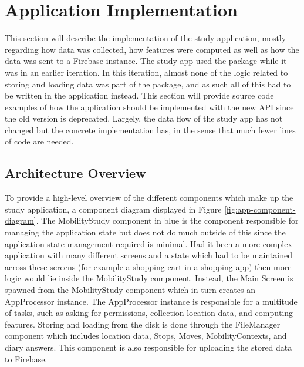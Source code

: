 \section{Application Implementation}
This section will describe the implementation of the study application, mostly regarding how data was collected, how features were computed as well as how the data was sent to a Firebase instance. The study app used the package while it was in an earlier iteration. In this iteration, almost none of the logic related to storing and loading data was part of the package, and as such all of this had to be written in the application instead. This section will provide source code examples of how the application should be implemented with the new API since the old version is deprecated. Largely, the data flow of the study app has not changed but the concrete implementation has, in the sense that much fewer lines of code are needed.

\subsection{Architecture Overview}
To provide a high-level overview of the different components which make up the study application, a component diagram displayed in Figure \ref{fig:app-component-diagram}. The MobilityStudy component in blue is the component responsible for managing the application state but does not do much outside of this since the application state management required is minimal. Had it been a more complex application with many different screens and a state which had to be maintained across these screens (for example a shopping cart in a shopping app) then more logic would lie inside the MobilityStudy component. Instead, the Main Screen is spawned from the MobilityStudy component which in turn creates an AppProcessor instance. The AppProcessor instance is responsible for a multitude of tasks, such as asking for permissions, collection location data, and computing features. Storing and loading from the disk is done through the FileManager component which includes location data, Stops, Moves, MobilityContexts, and diary answers. This component is also responsible for uploading the stored data to Firebase.

